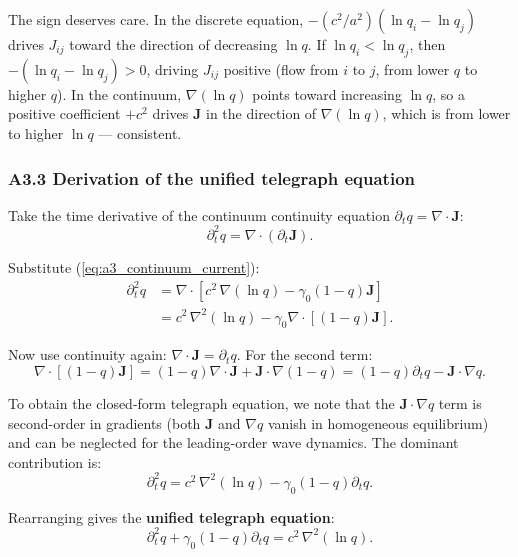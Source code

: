 \documentclass[reprint]{revtex4-2}
\begin{document}
The sign deserves care. In the discrete equation, $-(c^2/a^2)(\ln q_i - \ln q_j)$ drives $J_{ij}$ toward the direction of decreasing $\ln q$. If $\ln q_i < \ln q_j$, then $-(\ln q_i-\ln q_j) > 0$, driving $J_{ij}$ positive (flow from $i$ to $j$, from lower $q$ to higher $q$). In the continuum, $\nabla(\ln q)$ points toward increasing $\ln q$, so a positive coefficient $+c^2$ drives $\mathbf{J}$ in the direction of $\nabla(\ln q)$, which is from lower to higher $\ln q$ --- consistent.

\subsubsection{A3.3 Derivation of the unified telegraph equation}

Take the time derivative of the continuum continuity equation $\partial_t q = \nabla\cdot\mathbf{J}$:
\begin{equation}
\partial_t^2 q = \nabla\cdot(\partial_t\mathbf{J}).
\end{equation}

Substitute (\ref{eq:a3_continuum_current}):
\begin{align}
\partial_t^2 q &= \nabla\cdot\left[c^2\,\nabla(\ln q) - \gamma_0(1-q)\mathbf{J}\right] \\
&= c^2\,\nabla^2(\ln q) - \gamma_0\nabla\cdot[(1-q)\mathbf{J}].
\end{align}

Now use continuity again: $\nabla\cdot\mathbf{J} = \partial_t q$. For the second term:
\begin{equation}
\nabla\cdot[(1-q)\mathbf{J}] = (1-q)\nabla\cdot\mathbf{J} + \mathbf{J}\cdot\nabla(1-q) = (1-q)\partial_t q - \mathbf{J}\cdot\nabla q.
\end{equation}

To obtain the closed-form telegraph equation, we note that the $\mathbf{J}\cdot\nabla q$ term is second-order in gradients (both $\mathbf{J}$ and $\nabla q$ vanish in homogeneous equilibrium) and can be neglected for the leading-order wave dynamics. The dominant contribution is:
\begin{equation}
\partial_t^2 q = c^2\,\nabla^2(\ln q) - \gamma_0(1-q)\partial_t q.
\end{equation}

Rearranging gives the \textbf{unified telegraph equation}:
\begin{equation}
\boxed{\partial_t^2 q + \gamma_0(1-q)\partial_t q = c^2\,\nabla^2(\ln q)}.
\label{eq:a3_telegraph}
\end{equation}
\end{document}
